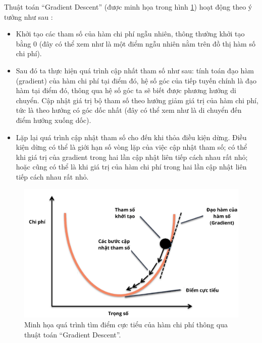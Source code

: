 Thuật toán ``Gradient Descent'' (được minh họa trong hình \ref{fig:2.4_GD}) hoạt động theo ý tưởng như sau : 
\begin{itemize}
    \item Khởi tạo các tham số của hàm chi phí ngẫu nhiên, thông thường khởi tạo bằng 0 (đây có thể xem như là một điểm ngẫu nhiên nằm trên đồ thị hàm số chi phí). 
    \item Sau đó ta thực hiện quá trình cập nhất tham số như sau: tính toán đạo hàm (gradient) của hàm chi phí tại điểm đó, hệ số góc của tiếp tuyến chính là đạo hàm tại điểm đó, thông qua hệ số góc ta sẽ biết được phương hướng di chuyển. Cập nhật giá trị bộ tham số theo hướng giảm giá trị của hàm chi phí, tức là theo hướng có góc dốc nhất (đây có thể xem như là di chuyển đến điểm hướng xuống dốc).
    \item Lặp lại quá trình cập nhật tham số cho đến khi thỏa điều kiện dừng. Điều kiện dừng có thể là giới hạn số vòng lặp của việc cập nhật tham số; có thể khi giá trị của gradient trong hai lần cập nhật liên tiếp cách nhau rất nhỏ; hoặc cũng có thể là khi giá trị của hàm chi phí trong hai lần cập nhật liên tiếp cách nhau rất nhỏ.
\end{itemize}

\begin{figure}[h]
    \centering
    \includegraphics[width=\textwidth]{images/Chapter2/GD.png}
    \caption{Minh họa quá trình tìm điểm cực tiểu của hàm chi phí thông qua thuật toán ``Gradient Descent''.}
    \label{fig:2.4_GD}
\end{figure}

